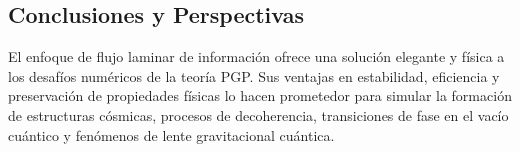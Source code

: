 \documentclass{book}
\begin{document}
\subsection{Conclusiones y Perspectivas}
El enfoque de flujo laminar de información ofrece una solución elegante y física a los desafíos numéricos de la teoría PGP. Sus ventajas en estabilidad, eficiencia y preservación de propiedades físicas lo hacen prometedor para simular la formación de estructuras cósmicas, procesos de decoherencia, transiciones de fase en el vacío cuántico y fenómenos de lente gravitacional cuántica.
\end{document}
